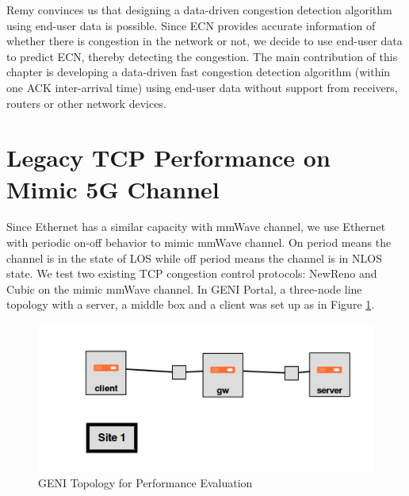 \par Remy convinces us that designing a data-driven congestion detection algorithm using end-user data is possible. Since ECN provides accurate information of whether there is congestion in the network or not, we decide to use end-user data to predict ECN, thereby detecting the congestion. The main contribution of this chapter is developing a data-driven fast congestion detection algorithm (within one ACK inter-arrival time) using end-user data without support from receivers, routers or other network devices.

\section{Legacy TCP Performance on Mimic 5G Channel}
\label{legacy}
\par Since Ethernet has a similar capacity with mmWave channel, we use Ethernet with periodic on-off behavior to mimic mmWave channel. On period means the channel is in the state of LOS while off period means the channel is in NLOS state. We test two existing TCP congestion control protocols: NewReno and Cubic on the mimic mmWave channel. In GENI Portal, a three-node line topology with a server, a middle box and a client was set up as in Figure \ref{genitopo}. 
\begin{figure}
\centering
\includegraphics[width=14cm]{topologyGeni.png}
\caption{GENI Topology for Performance Evaluation}
\label{genitopo}
\end{figure}
